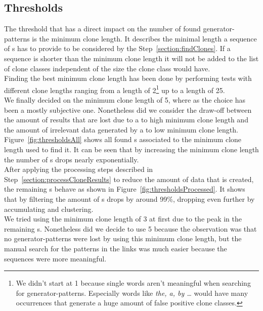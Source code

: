 \subsection{Thresholds}
The threshold that has a direct impact on the number of found generator-patterns is the minimum clone length. It describes the minimal length a sequence of s has to provide to be considered by the Step~\ref{section:findClones}. If a sequence is shorter than the minimum clone length it will not be added to the list of clone classes independent of the size the clone class would have.\\
Finding the best minimum clone length has been done by performing tests with different clone lengths ranging from a length of 2\footnote{We didn't start at 1 because single words aren't meaningful when searching for generator-patterns. Especially words like \textit{the, a, by \dots} would have many occurrences that generate a huge amount of false positive clone classes.} up to a length of 25.\\
We finally decided on the minimum clone length of 5, where as the choice has been a mostly subjective one. Nonetheless did we consider the draw-off between the amount of results that are lost due to a to high minimum clone length and the amount of irrelevant data generated by a to low minimum clone length.\\
Figure~\ref{fig:thresholdsAll} shows all found s associated to the minimum clone length used to find it. It can be seen that by increasing the minimum clone length the number of s drops nearly exponentially. \\
After applying the processing steps described in Step~\ref{section:processCloneResults} to reduce the amount of data that is created, the remaining s behave as shown in Figure~\ref{fig:thresholdsProcessed}. It shows that by filtering the amount of s drops by around 99\%, dropping even further by accumulating and clustering.\\
We tried using the minimum clone length of 3 at first due to the peak in the remaining s. Nonetheless did we decide to use 5 because the observation was that no generator-patterns were lost by using this minimum clone length, but the manual search for the patterns in the links was much easier because the sequences were more meaningful.



